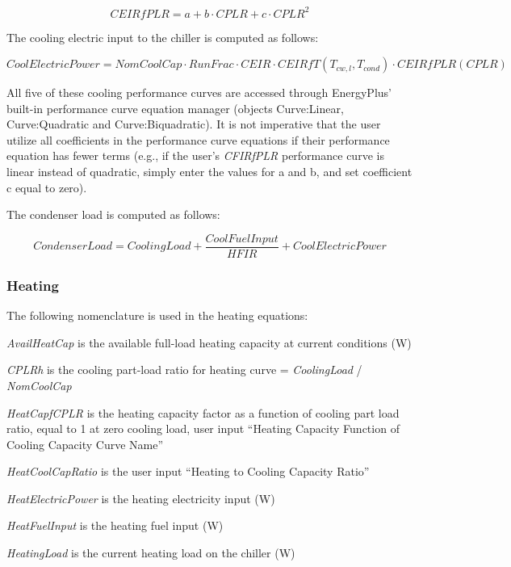 \begin{equation}
CEIRfPLR = a + b \cdot CPLR + c \cdot CPL{R^2}
\end{equation}

The cooling electric input to the chiller is computed as follows:

\begin{equation}
CoolElectricPower = NomCoolCap \cdot RunFrac \cdot CEIR \cdot CEIRfT({T_{cw,l}},{T_{cond}}) \cdot CEIRfPLR(CPLR)
\end{equation}

All five of these cooling performance curves are accessed through EnergyPlus' built-in performance curve equation manager (objects Curve:Linear, Curve:Quadratic and Curve:Biquadratic). It is not imperative that the user utilize all coefficients in the performance curve equations if their performance equation has fewer terms (e.g., if the user's \emph{CFIRfPLR} performance curve is linear instead of quadratic, simply enter the values for a and b, and set coefficient c equal to zero).

The condenser load is computed as follows:

\begin{equation}
CondenserLoad = CoolingLoad + {\frac{{CoolFuelInput}}{{HFIR}}} + CoolElectricPower
\end{equation}

\subsubsection{Heating}\label{heating}

The following nomenclature is used in the heating equations:

\emph{AvailHeatCap} is the available full-load heating capacity at current conditions (W)

\emph{CPLRh} is the cooling part-load ratio for heating curve = \emph{CoolingLoad} / \emph{NomCoolCap}

\emph{HeatCapfCPLR} is the heating capacity factor as a function of cooling part load ratio, equal to 1 at zero cooling load, user input ``Heating Capacity Function of Cooling Capacity Curve Name''

\emph{HeatCoolCapRatio} is the user input ``Heating to Cooling Capacity Ratio''

\emph{HeatElectricPower} is the heating electricity input (W)

\emph{HeatFuelInput} is the heating fuel input (W)

\emph{HeatingLoad} is the current heating load on the chiller (W)

